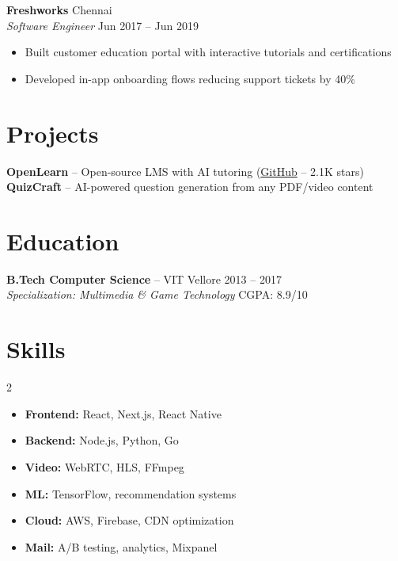 \documentclass[10pt,letterpaper]{article}
\begin{document}
\textbf{Freshworks} \hfill Chennai\\
\textit{Software Engineer} \hfill Jun 2017 -- Jun 2019
\begin{itemize}
\item Built customer education portal with interactive tutorials and certifications
\item Developed in-app onboarding flows reducing support tickets by 40\%
\end{itemize}

\section{Projects}
\textbf{OpenLearn} -- Open-source LMS with AI tutoring (\href{https://github.com/vikramd/openlearn}{GitHub} -- 2.1K stars)\\
\textbf{QuizCraft} -- AI-powered question generation from any PDF/video content

\section{Education}
\textbf{B.Tech Computer Science} -- VIT Vellore \hfill 2013 -- 2017\\
\textit{Specialization: Multimedia \& Game Technology} \hfill CGPA: 8.9/10

\section{Skills}
\begin{multicols}{2}
\begin{itemize}[label={}]
\item \textbf{Frontend:} React, Next.js, React Native
\item \textbf{Backend:} Node.js, Python, Go
\item \textbf{Video:} WebRTC, HLS, FFmpeg
\item \textbf{ML:} TensorFlow, recommendation systems
\item \textbf{Cloud:} AWS, Firebase, CDN optimization
\item \textbf{Mail:} A/B testing, analytics, Mixpanel
\end{itemize}
\end{multicols}
\end{document}
